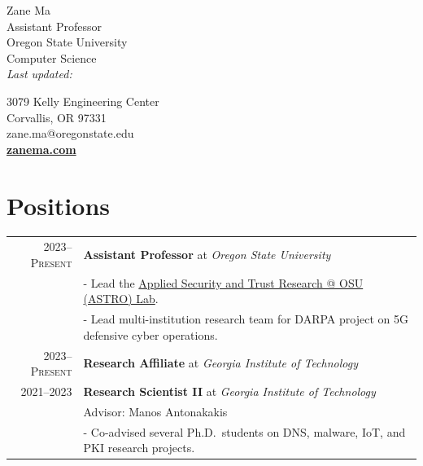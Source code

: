 \documentclass[10pt,singlecolumn]{article} %
\def\parsedate #1:20#2#3#4#5#6#7#8\empty{20#2#3/#4#5/#6#7}
\def\moddate#1{\expandafter\parsedate\pdffilemoddate{#1}\empty}
\begin{document}
\color{text1} %

\begin{minipage}[t]{0.5\textwidth}
{\Huge Zane Ma} \vspace{0.5cm}\\ %
Assistant Professor  \\
Oregon State University \\
Computer Science \\
\emph{Last updated: \moddate{\jobname.tex}}

\end{minipage}
\begin{minipage}[t]{0.5\textwidth}
\begin{flushright}
\vspace{\baselineskip}
3079 Kelly Engineering Center \\
Corvallis, OR 97331 \\
zane.ma@oregonstate.edu \\ 
\textbf{\href{https://zanema.com}{zanema.com}}
\end{flushright}
\end{minipage}





\vspace{0.3cm}
\section{Positions}

\begin{tabular}{rl}

2023--\textsc{Present} & \textbf{Assistant Professor} at \emph{Oregon State University}\\ 
	& - Lead the \href{https://astrolab.site}{Applied Security and Trust Research @ OSU (ASTRO) Lab}. \\
	& - Lead multi-institution research team for DARPA project on 5G defensive cyber operations.\\

2023--\textsc{Present} & \textbf{Research Affiliate} at \emph{Georgia Institute of Technology}\\
2021--\textsc{2023} & \textbf{Research Scientist II} at \emph{Georgia Institute of Technology}\\ 
& Advisor: Manos Antonakakis \\
& - Co-advised several Ph.D.\ students on DNS, malware, IoT, and PKI research projects. \\
\end{tabular}\\
\end{document}
